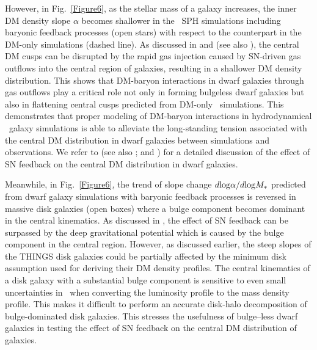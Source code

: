 \documentclass[natbib209]{emulateapj}
\begin{document}
However, in Fig.~\ref{Figure6}, as the stellar mass of a galaxy increases, the inner DM
density slope $\alpha$ becomes shallower in the \LCDM\ SPH simulations
including baryonic feedback processes (open stars) with respect to the counterpart in the
DM-only simulations (dashed line). As discussed in \cite{Governato_2010} and
\cite{Pontzen_2012} (see also \citeauthor{2014MNRAS.437..415D}
\citeyear{2014MNRAS.437..415D}), the central DM cusps can be disrupted by the rapid gas
injection caused by SN-driven gas outflows into the
central region of galaxies, resulting in a shallower DM density distribution.
This shows that DM-baryon interactions in dwarf galaxies through gas outflows
play a critical role not only in forming bulgeless dwarf galaxies but also in
flattening central cusps predicted from DM-only \LCDM\ simulations. This
demonstrates that proper modeling of DM-baryon interactions in hydrodynamical \LCDM\ 
galaxy simulations is able to alleviate the long-standing tension associated
with the central DM distribution in dwarf galaxies between simulations
and observations. We refer to \cite{Governato_2012} (see also \citeauthor{Pontzen_2012}
\citeyear{Pontzen_2012}; \citeyear{Pontzen_2014} and
\citeauthor{2014MNRAS.437..415D} \citeyear{2014MNRAS.437..415D}) for a detailed
discussion of the effect of SN feedback on the central DM distribution in dwarf
galaxies.

Meanwhile, in Fig.~\ref{Figure6}, the trend of slope change $d{\rm
log}\alpha/d{\rm log}M_{*}$ predicted from dwarf galaxy simulations with
baryonic feedback processes is reversed in massive disk galaxies (open boxes)
where a bulge component becomes dominant in the central kinematics. As discussed
in \cite{2014MNRAS.437..415D}, the effect of SN feedback can be surpassed by the
deep gravitational potential which is caused by the bulge component in the central
region. However, as discussed earlier, the steep slopes of the THINGS disk
galaxies could be partially affected by the minimum disk assumption used for
deriving their DM density profiles. The central kinematics of a disk galaxy with
a substantial bulge component is sensitive to even small uncertainties in \ML\
when converting the luminosity profile to the mass density profile. This makes
it difficult to perform an accurate disk-halo decomposition of bulge-dominated
disk galaxies. This stresses the usefulness of bulge--less dwarf galaxies in
testing the effect of SN feedback on the central DM distribution of galaxies.
\end{document}
